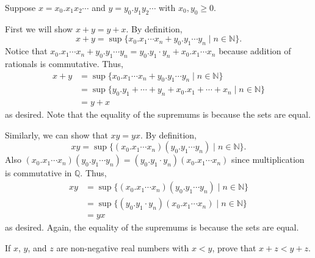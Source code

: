 \documentclass[12 pt, letterpaper]{hmcpset}
\begin{document}
\begin{solution}
	Suppose $x = x_{0}.x_{1} x_{2} \cdots$ and $y = y_{0}.y_{1} y_{2} \cdots$ with $x_{0}, y_{0} \ge 0$.

	First we will show $x + y = y + x$. By definition,
	\[
		x + y = \sup \{ x_{0}.x_{1} \cdots x_{n} + y_{0}.y_{1} \cdots y_{n} \mid n \in \mathbb{N} \}.
	\]
	Notice that $x_{0}.x_{1} \cdots x_{n} + y_{0}.y_{1} \cdots y_{n} = y_{0}.y_{1} \cdot y_{n} + x_{0}.x_{1} \cdots x_{n}$ because addition of rationals is commutative. Thus,
	 \[
		\begin{split}
			x + y & = \sup \{ x_{0}.x_{1} \cdots x_{n} + y_{0}.y_{1} \cdots y_{n} \mid n \in \mathbb{N} \} \\
			      & = \sup \{ y_{0}.y_{1} + \cdots + y_{n} + x_{0}.x_{1} + \cdots + x_{n} \mid n \in \mathbb{N} \} \\
			      & = y + x
		\end{split}
	\]
	as desired. Note that the equality of the supremums is because the sets are equal.

	Similarly, we can show that $xy = yx$. By definition,
	\[
		xy = \sup \{ (x_{0}.x_{1} \cdots x_{n})(y_{0}.y_{1} \cdots y_{n}) \mid n \in \mathbb{N} \}.
	\]
	Also $(x_{0}.x_{1} \cdots x_{n}) (y_{0}.y_{1} \cdots y_{n}) = (y_{0}.y_{1} \cdot y_{n}) (x_{0}.x_{1} \cdots x_{n})$ since multiplication is commutative in $\mathbb{Q}$. Thus,
	\[
		\begin{split}
			xy & = \sup \{ (x_{0}.x_{1} \cdots x_{n})(y_{0}.y_{1} \cdots y_{n}) \mid n \in \mathbb{N} \} \\
			      & = \sup \{ (y_{0}.y_{1} \cdot y_{n}) (x_{0}.x_{1} \cdots x_{n}) \mid n \in \mathbb{N} \} \\
			      & = yx
		\end{split}
	\]
	as desired. Again, the equality of the supremums is because the sets are equal.
\end{solution}

\pagebreak

\begin{problem}[3.]
	If $x$, $y$, and $z$ are non-negative real numbers with $x < y$, prove that $x + z < y + z$.
\end{problem}
\end{document}
